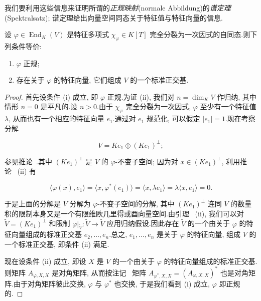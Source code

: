 我们要利用这些信息来证明所谓的\emph{正规映射}(\textup{normale Abbildung})的\emph{谱定理}(\textup{Spektralsatz}); 谱定理给出向量空间同态关于特征值与特征向量的信息.

\begin{theorem}[谱定理]\label{thm:7.4.8}
设 $\varphi \in \operatorname{End}_K(V)$ 是特征多项式 $\chi_\varphi \in K[T]$ 完全分裂为一次因式的自同态.则下列条件等价:
\begin{enumerate}
\item[(i)] $\varphi$ 正规;
\item[(ii)] 存在关于 $\varphi$ 的特征向量, 它们组成 $V$ 的一个标准正交基.
\end{enumerate}
\end{theorem}

\begin{proof}
首先设条件 (i) 成立, 即 $\varphi$ 正规.为证 (ii), 我们对 $n = \dim_K V$ 作归纳, 其中情形 $n = 0$ 是平凡的.设 $n > 0$.由于 $\chi_\varphi$ 完全分裂为一次因式, $\varphi$ 至少有一个特征值 $\lambda$, 从而也有一个相应的特征向量 $e_1$.通过对 $e_1$ 规范化, 可以假定 $|e_1| = 1$.现在考察分解

\[
V = K e_1 \oplus (K e_1)^{\perp};
\]

参见推论~.其中 $(K e_1)^{\perp}$ 是 $V$ 的 $\varphi$-不变子空间; 因为对 $x \in (K e_1)^{\perp}$, 利用推论~ (ii) 有

\[
\bigl\langle \varphi(x), e_1 \bigr\rangle = \bigl\langle x, \varphi^*(e_1) \bigr\rangle = \bigl\langle x, \overline{\lambda} e_1 \bigr\rangle = \lambda \bigl\langle x, e_1 \bigr\rangle = 0\text{.}
\]

于是上面的分解是 $V$ 分解为 $\varphi$-不变子空间的分解, 其中 $(K e_1)^{\perp}$ 连同 $V$ 的数量积的限制本身又是一个有限维欧几里得或酉向量空间.由引理~ (ii), 我们可以对 $\tilde{V} = (K e_1)^{\perp}$ 和限制 $\varphi|_{\tilde{V}} \colon \tilde{V} \longrightarrow \tilde{V}$ 应用归纳假设.因此存在 $\tilde{V}$ 的一个由关于 $\varphi$ 的特征向量组成的标准正交基 $e_2, \ldots, e_n$.总之, $e_1, \ldots, e_n$ 是关于 $\varphi$ 的特征向量, 组成 $V$ 的一个标准正交基, 即条件 (ii) 满足.

现在设条件 (ii) 成立, 即设 $X$ 是 $V$ 的一个由关于 $\varphi$ 的特征向量组成的标准正交基.则矩阵 $A_{\varphi, X, X}$ 是对角矩阵, 从而按注记~ 矩阵 $A_{\varphi^*, X, X} = (A_{\varphi, X, X})^*$ 也是对角矩阵.由于对角矩阵彼此交换, $\varphi$ 与 $\varphi^*$ 也交换, 于是我们看到 (i) 成立, $\varphi$ 即正规的.
\end{proof}

